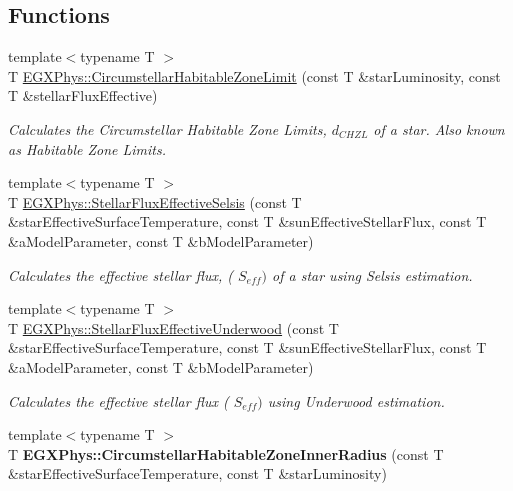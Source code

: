 \subsection*{Functions}
\begin{DoxyCompactItemize}
\item 
{\footnotesize template$<$typename T $>$ }\\T \hyperlink{group___astrophysics_ga23a8f602461ea3257e8767b1d455c383}{E\+G\+X\+Phys\+::\+Circumstellar\+Habitable\+Zone\+Limit} (const T \&star\+Luminosity, const T \&stellar\+Flux\+Effective)
\begin{DoxyCompactList}\small\item\em Calculates the Circumstellar Habitable Zone Limits, $d_{CHZL}$ of a star. Also known as Habitable Zone Limits. \end{DoxyCompactList}\item 
{\footnotesize template$<$typename T $>$ }\\T \hyperlink{group___astrophysics_ga3ce3a04fec7b1c8fb66ac54270ce3902}{E\+G\+X\+Phys\+::\+Stellar\+Flux\+Effective\+Selsis} (const T \&star\+Effective\+Surface\+Temperature, const T \&sun\+Effective\+Stellar\+Flux, const T \&a\+Model\+Parameter, const T \&b\+Model\+Parameter)
\begin{DoxyCompactList}\small\item\em Calculates the effective stellar flux, ( $S_{eff})$ of a star using Selsis estimation. \end{DoxyCompactList}\item 
{\footnotesize template$<$typename T $>$ }\\T \hyperlink{group___astrophysics_ga34d1e39bce17904bc6d383f1935c79d6}{E\+G\+X\+Phys\+::\+Stellar\+Flux\+Effective\+Underwood} (const T \&star\+Effective\+Surface\+Temperature, const T \&sun\+Effective\+Stellar\+Flux, const T \&a\+Model\+Parameter, const T \&b\+Model\+Parameter)
\begin{DoxyCompactList}\small\item\em Calculates the effective stellar flux ( $S_{eff})$ using Underwood estimation. \end{DoxyCompactList}\item 
\mbox{\label{namespace_e_g_x_phys_abcc7fdd3086efb4c0b786960a45c02e2}} 
{\footnotesize template$<$typename T $>$ }\\T {\bfseries E\+G\+X\+Phys\+::\+Circumstellar\+Habitable\+Zone\+Inner\+Radius} (const T \&star\+Effective\+Surface\+Temperature, const T \&star\+Luminosity)

\end{DoxyCompactItemize}

